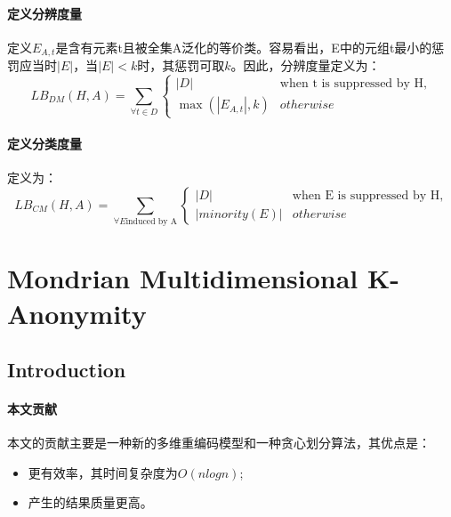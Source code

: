 \documentclass[12pt,a4paper]{article}
\begin{document}
\paragraph{定义分辨度量} 定义$E_{A,t}$是含有元素t且被全集A泛化的等价类。容易看出，E中的元组t最小的惩罚应当时$|E|$，当$|E| < k$时，其惩罚可取$k$。因此，分辨度量定义为：
\begin{equation}
	LB_{DM}(H,A) = \sum_{\forall t \in D} \left\{\begin{matrix}
						|D| & \mbox{when t is suppressed by H,}
						\\ 
						\max(|E_{A,t}|, k) & otherwise
						\end{matrix}\right.
\end{equation}

\paragraph{定义分类度量} 定义为：
\begin{equation}
	LB_{CM}(H,A) = \sum_{\forall E \mbox{induced by A} } \left\{\begin{matrix}
						|D| & \mbox{when E is suppressed by H,}
						\\ 
						|minority(E)| & otherwise
						\end{matrix}\right.
\end{equation}























\section{Mondrian Multidimensional K-Anonymity\cite{mondrian} }
\subsection{Introduction}
\paragraph{本文贡献} 本文的贡献主要是一种新的多维重编码模型和一种贪心划分算法，其优点是：
	\begin{itemize}
		\item 更有效率，其时间复杂度为$O(nlogn)$;
		\item 产生的结果质量更高。
	\end{itemize}
\end{document}
